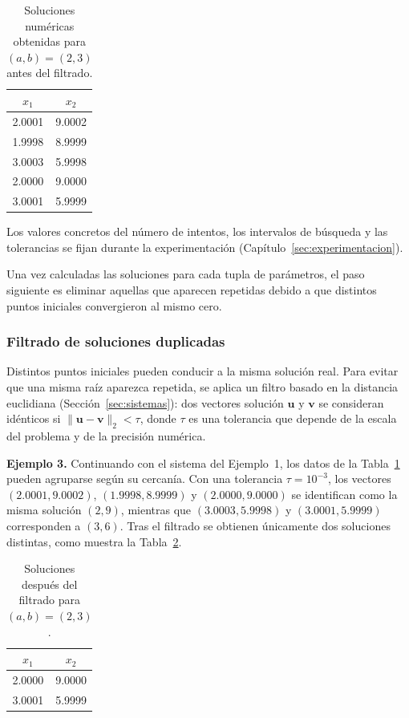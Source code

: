 \documentclass{article} \usepackage[utf8]{inputenc} \usepackage[spanish]{babel} \spanishdecimal{.} \usepackage{amsmath, amssymb, amsthm} \usepackage{bm} \usepackage{float} \usepackage{longtable} \usepackage[hidelinks]{hyperref}
\begin{document}
\begin{table}[H]
\centering
\caption{Soluciones numéricas obtenidas para \((a,b) = (2,3)\)
antes del filtrado.}
\label{tab:soluciones_brutas}
\begin{tabular}{c|c}
\(x_1\) & \(x_2\) \\
\hline
2.0001 & 9.0002 \\
1.9998 & 8.9999 \\
3.0003 & 5.9998 \\
2.0000 & 9.0000 \\
3.0001 & 5.9999 \\
\end{tabular}
\end{table}

Los valores concretos del número de intentos, los intervalos de
búsqueda y las tolerancias se fijan durante la experimentación
(Capítulo~\ref{sec:experimentacion}).

Una vez calculadas las soluciones para cada tupla de parámetros, el
paso siguiente es eliminar aquellas que aparecen repetidas debido a
que distintos puntos iniciales convergieron al mismo cero.

\subsubsection{Filtrado de soluciones duplicadas}

Distintos puntos iniciales pueden conducir a la misma solución real.
Para evitar que una misma raíz aparezca repetida, se aplica un filtro
basado en la distancia euclidiana
(Sección~\ref{sec:sistemas}): dos vectores solución \(\mathbf{u}\) y
\(\mathbf{v}\) se consideran idénticos si
\(\|\mathbf{u} - \mathbf{v}\|_2 < \tau\), donde \(\tau\) es una
tolerancia que depende de la escala del problema y de la precisión
numérica.

\noindent\textbf{Ejemplo 3.} Continuando con el sistema del Ejemplo~1,
los datos de la Tabla~\ref{tab:soluciones_brutas} pueden agruparse
según su cercanía. Con una tolerancia \(\tau = 10^{-3}\), los vectores
\((2.0001, 9.0002)\), \((1.9998, 8.9999)\) y \((2.0000, 9.0000)\) se
identifican como la misma solución \((2,9)\), mientras que
\((3.0003, 5.9998)\) y \((3.0001, 5.9999)\) corresponden a \((3,6)\).
Tras el filtrado se obtienen únicamente dos soluciones distintas, como
muestra la Tabla~\ref{tab:soluciones_filtradas}.

\begin{table}[H]
\centering
\caption{Soluciones después del filtrado para \((a,b) = (2,3)\).}
\label{tab:soluciones_filtradas}
\begin{tabular}{c|c}
\(x_1\) & \(x_2\) \\
\hline
2.0000 & 9.0000 \\
3.0001 & 5.9999 \\
\end{tabular}
\end{table}
\end{document}
